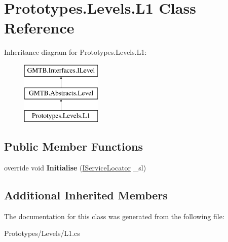 \hypertarget{class_prototypes_1_1_levels_1_1_l1}{}\section{Prototypes.\+Levels.\+L1 Class Reference}
\label{class_prototypes_1_1_levels_1_1_l1}
Inheritance diagram for Prototypes.\+Levels.\+L1\+:\begin{figure}[H]
\begin{center}
\leavevmode
\includegraphics[height=3.000000cm]{class_prototypes_1_1_levels_1_1_l1}
\end{center}
\end{figure}
\subsection*{Public Member Functions}
\begin{DoxyCompactItemize}
\item 
\mbox{\label{class_prototypes_1_1_levels_1_1_l1_acdc4fddb5e25296cce22e0c275b32de7}} 
override void {\bfseries Initialise} (\mbox{\hyperlink{interface_g_m_t_b_1_1_interfaces_1_1_i_service_locator}{I\+Service\+Locator}} \+\_\+sl)
\end{DoxyCompactItemize}
\subsection*{Additional Inherited Members}


The documentation for this class was generated from the following file\+:\begin{DoxyCompactItemize}
\item 
Prototypes/\+Levels/L1.\+cs\end{DoxyCompactItemize}
